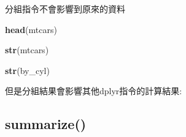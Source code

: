 \documentclass[]{book}
\newenvironment{Shaded}{\begin{snugshade}}{\end{snugshade}}
\newcommand{\DataTypeTok}[1]{\textcolor[rgb]{0.13,0.29,0.53}{#1}}
\newcommand{\KeywordTok}[1]{\textcolor[rgb]{0.13,0.29,0.53}{\textbf{#1}}}
\newcommand{\NormalTok}[1]{#1}
\newcommand{\OperatorTok}[1]{\textcolor[rgb]{0.81,0.36,0.00}{\textbf{#1}}}
\newcommand{\StringTok}[1]{\textcolor[rgb]{0.31,0.60,0.02}{#1}}
\theoremstyle{definition}
\theoremstyle{definition}
\theoremstyle{definition}
\theoremstyle{remark}
\begin{document}
分組指令不會影響到原來的資料

\begin{Shaded}
\begin{Highlighting}[]
\KeywordTok{head}\NormalTok{(mtcars)}
\end{Highlighting}
\end{Shaded}

\begin{Shaded}
\begin{Highlighting}[]
\KeywordTok{str}\NormalTok{(mtcars)}
\end{Highlighting}
\end{Shaded}

\begin{Shaded}
\end{Shaded}

\begin{Shaded}
\begin{Highlighting}[]
\KeywordTok{str}\NormalTok{(by_cyl)}
\end{Highlighting}
\end{Shaded}

但是分組結果會影響其他dplyr指令的計算結果:

\begin{Shaded}
\end{Shaded}

\begin{Shaded}
\end{Shaded}

\hypertarget{summarize}{%
\subsection{summarize()}\label{summarize}}
\end{document}
